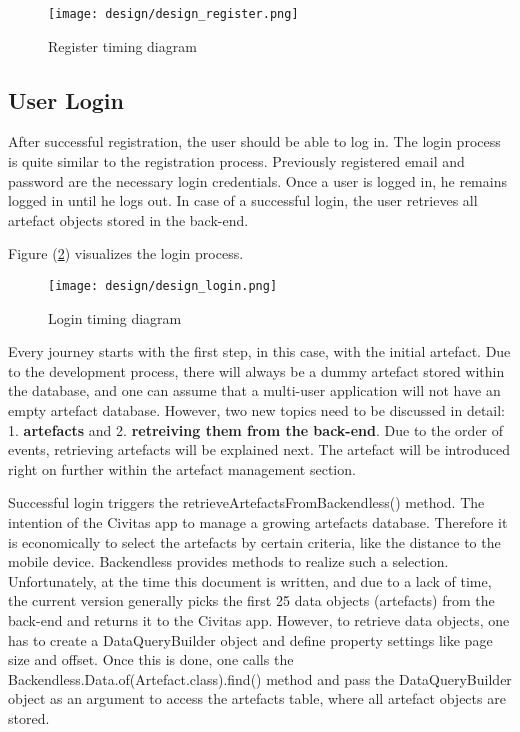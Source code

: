 \begin{figure}[H]
	\centering \texttt{[image: design/design\_register.png]}
	\caption{Register timing diagram}
	\label{fig:designRegister}
\end{figure}

\subsection{User Login}
After successful registration, the user should be able to log in. The login process is quite similar to the registration process. Previously registered email and password are the necessary login credentials.
Once a user is logged in, he remains logged in until he logs out. In case of a successful login, the user retrieves all artefact objects stored in the back-end. 

\fbox{

}



Figure (\ref{fig:designLogin}) visualizes the login process. 

\begin{figure}[H]
	\centering \texttt{[image: design/design\_login.png]}
	\caption{Login timing diagram}
	\label{fig:designLogin}
\end{figure}

Every journey starts with the first step, in this case, with the initial artefact. Due to the development process, there will always be a dummy artefact stored within the database, and one can assume that a multi-user application will not have an empty artefact database. However, two new topics need to be discussed in detail: 1. \textbf{artefacts} and 2. \textbf{retreiving them from the back-end}.
Due to the order of events, retrieving artefacts will be explained next. The artefact will be introduced right on further within the artefact management section.

Successful login triggers the retrieveArtefactsFromBackendless() method. The intention of the Civitas app to manage a growing artefacts database. Therefore it is economically to select the artefacts by certain criteria, like the distance to the mobile device. Backendless provides methods to realize such a selection. Unfortunately, at the time this document is written, and due to a lack of time, the current version generally picks the first 25 data objects (artefacts) from the back-end and returns it to the Civitas app. 
However, to retrieve data objects, one has to create a DataQueryBuilder object and define property settings like page size and offset. Once this is done, one calls the Backendless.Data.of(Artefact.class).find() method and pass the DataQueryBuilder object as an argument to access the artefacts table, where all artefact objects are stored.


